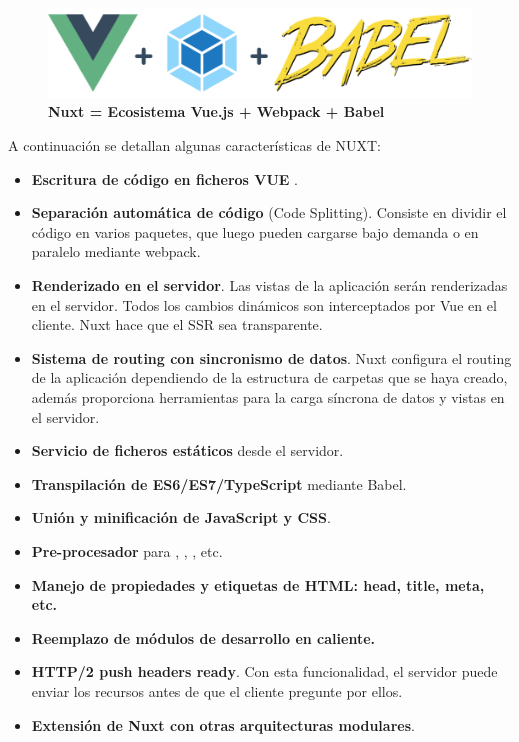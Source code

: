 \begin{figure}[h]
    \includegraphics[width=14cm]{Img/Desarrollo/sistema5.png}
    \centering
    \caption{\textbf{ \footnotesize{Nuxt = Ecosistema Vue.js + Webpack + Babel}}}
     \label{fig:sistema5}
\end{figure}
    
\vspace{5mm}
A continuación se detallan algunas características de NUXT:
\begin{itemize}
    \item \textbf{Escritura de código en ficheros VUE} .
    \item \textbf{Separación automática de código} (Code Splitting). Consiste en dividir el código en varios paquetes, que luego pueden cargarse bajo demanda o en paralelo mediante webpack.
    \item \textbf{Renderizado en el servidor}. Las vistas de la aplicación serán renderizadas en el servidor. Todos los cambios dinámicos son interceptados por Vue en el cliente. Nuxt hace que el SSR sea transparente.
    \item \textbf{Sistema de routing con sincronismo de datos}. Nuxt configura el routing de la aplicación dependiendo de la estructura de carpetas que se haya creado, además proporciona herramientas para la carga síncrona de datos y vistas en el servidor.
    \item \textbf{Servicio de ficheros estáticos} desde el servidor.
    \item \textbf{Transpilación de ES6/ES7/TypeScript} mediante Babel.
    \item \textbf{Unión y minificación de JavaScript y CSS}.
    \item \textbf{Pre-procesador} para , ,
    , etc.
    \item \textbf{Manejo de propiedades y etiquetas de HTML: head, title, meta, etc.}
    \item \textbf{Reemplazo de módulos de desarrollo en caliente.}
    \item \textbf{HTTP/2 push headers ready}. Con esta funcionalidad, el servidor puede enviar los recursos antes de que el cliente pregunte por ellos.
    \item \textbf{Extensión de Nuxt con otras arquitecturas modulares}.
\end{itemize}

